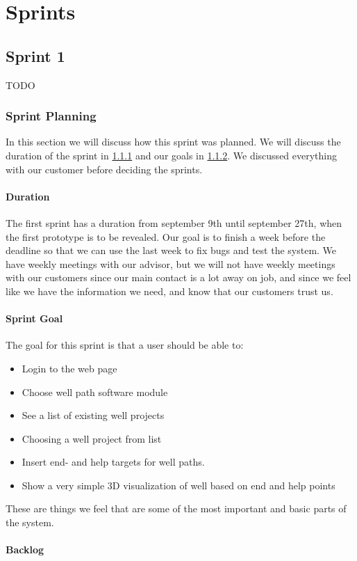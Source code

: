 \documentclass{report}
\begin{document}
\part{Sprints}

\chapter{Sprint 1} \label{cha:sprint_1}
TODO
\section{Sprint Planning} \label{sec:sprint_planning}
In this section we will discuss how this sprint was planned. We will discuss the duration of the sprint in \ref{subsec:duration} and our goals in \ref{subsec:sprint_goal}. We discussed everything with our customer before deciding the sprints.
\subsection{Duration} \label{subsec:duration}
The first sprint has a duration from september 9th until september 27th, when the first prototype is to be revealed. Our goal is to finish a week before the deadline so that we can use the last week to fix bugs and test the system. We have weekly meetings with our advisor, but we will not have weekly meetings with our customers since our main contact is a lot away on job, and since we feel like we have the information we need, and know that our customers trust us.

\subsection{Sprint Goal} \label{subsec:sprint_goal}
The goal for this sprint is that a user should be able to:
\begin{itemize}
\item Login to the web page 
\item Choose well path software module 
\item See a list of existing well projects
\item Choosing a well project from list
\item Insert end- and help targets for well paths.
\item Show a very simple 3D visualization of well based on end and help points
\end{itemize}
These are things we feel that are some of the most important and basic parts of the system.
\subsection{Backlog} \label{subsec:backlog} %
\end{document}
